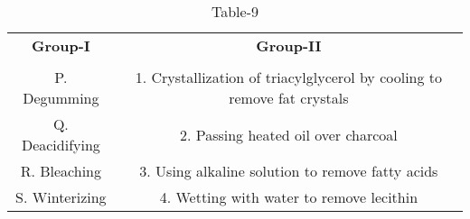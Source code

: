 \begin{table}[htbp]
  \centering
  \caption{Table-9}
  \label{tab:tables/table9.tex}
  \begin{tabular}{cc}
  \textbf{Group-I} & \textbf{Group-II} \\ \\
    P. Degumming & 1. Crystallization of triacylglycerol by cooling to remove fat crystals \\
    Q. Deacidifying & 2. Passing heated oil over charcoal \\
    R. Bleaching & 3. Using alkaline solution to remove fatty acids \\
    S. Winterizing & 4. Wetting with water to remove lecithin \\
  \end{tabular}
\end{table}